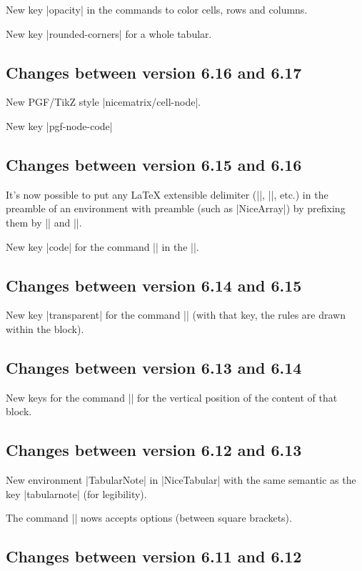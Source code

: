 \documentclass[dvipsnames]{article}%
\begin{document}
New key |opacity| in the commands to color cells, rows and columns.

New key |rounded-corners| for a whole tabular.


\subsection*{Changes between version 6.16 and 6.17}

New PGF/TikZ style |nicematrix/cell-node|.

New key |pgf-node-code|

\subsection*{Changes between version 6.15 and 6.16}

It's now possible to put any LaTeX extensible delimiter (|\lgroup|, |\langle|,
etc.) in the preamble of an environment with preamble (such as |{NiceArray}|)
by prefixing them by |\left| and |\right|.

New key |code| for the command |\SubMatrix| in the |\CodeAfter|.

\subsection*{Changes between version 6.14 and 6.15}

New key |transparent| for the command |\Block| (with that key, the rules are
drawn within the block).

\subsection*{Changes between version 6.13 and 6.14}

New keys for the command |\Block| for the vertical position of the content of
that block.

\subsection*{Changes between version 6.12 and 6.13}

New environment |{TabularNote}| in |{NiceTabular}| with the same semantic as
the key |tabularnote| (for legibility).

The command |\Hline| nows accepts options (between square brackets).

\subsection*{Changes between version 6.11 and 6.12}
\end{document}

